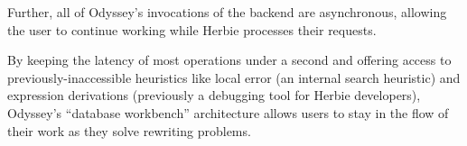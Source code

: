 Further, all of Odyssey's invocations of the backend are asynchronous,
  allowing the user to continue working
  while Herbie processes their requests.


By keeping the latency of most operations under a second
  and offering access to previously-inaccessible heuristics 
  like local error (an internal search heuristic) 
  and expression derivations (previously a debugging tool for Herbie developers),
  Odyssey's ``database workbench'' architecture
  allows users to stay in the flow of their work as they solve rewriting problems.

